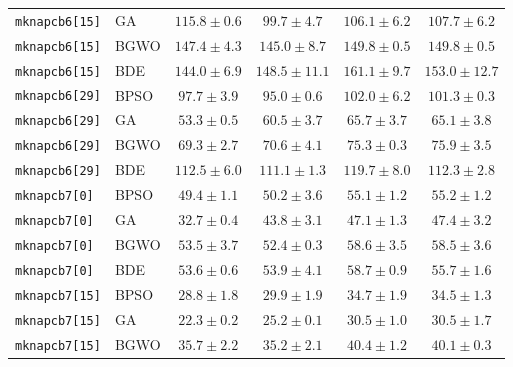 \documentclass[journal,article,submit,moreauthors]{Definitions/mdpi}
\begin{document}
\begin{longtable}{llcccc}
    \texttt{mknapcb6[15]} & GA    &          $115.8 \pm 0.6$ &  $\mathbf{99.7 \pm 4.7}$ &          $106.1 \pm 6.2$ &          $107.7 \pm 6.2$ \\
    \texttt{mknapcb6[15]} & BGWO  &          $147.4 \pm 4.3$ & $\mathbf{145.0 \pm 8.7}$ &          $149.8 \pm 0.5$ &          $149.8 \pm 0.5$ \\
    \texttt{mknapcb6[15]} & BDE   & $\mathbf{144.0 \pm 6.9}$ &         $148.5 \pm 11.1$ &          $161.1 \pm 9.7$ &         $153.0 \pm 12.7$ \\
    \midrule
    \texttt{mknapcb6[29]} & BPSO  &           $97.7 \pm 3.9$ &  $\mathbf{95.0 \pm 0.6}$ &          $102.0 \pm 6.2$ &          $101.3 \pm 0.3$ \\
    \texttt{mknapcb6[29]} & GA    &  $\mathbf{53.3 \pm 0.5}$ &           $60.5 \pm 3.7$ &           $65.7 \pm 3.7$ &           $65.1 \pm 3.8$ \\
    \texttt{mknapcb6[29]} & BGWO  &  $\mathbf{69.3 \pm 2.7}$ &           $70.6 \pm 4.1$ &           $75.3 \pm 0.3$ &           $75.9 \pm 3.5$ \\
    \texttt{mknapcb6[29]} & BDE   &          $112.5 \pm 6.0$ & $\mathbf{111.1 \pm 1.3}$ &          $119.7 \pm 8.0$ &          $112.3 \pm 2.8$ \\
    \midrule
    \texttt{mknapcb7[0]} & BPSO  &  $\mathbf{49.4 \pm 1.1}$ &           $50.2 \pm 3.6$ &           $55.1 \pm 1.2$ &           $55.2 \pm 1.2$ \\
    \texttt{mknapcb7[0]} & GA    &  $\mathbf{32.7 \pm 0.4}$ &           $43.8 \pm 3.1$ &           $47.1 \pm 1.3$ &           $47.4 \pm 3.2$ \\
    \texttt{mknapcb7[0]} & BGWO  &           $53.5 \pm 3.7$ &  $\mathbf{52.4 \pm 0.3}$ &           $58.6 \pm 3.5$ &           $58.5 \pm 3.6$ \\
    \texttt{mknapcb7[0]} & BDE   &  $\mathbf{53.6 \pm 0.6}$ &           $53.9 \pm 4.1$ &           $58.7 \pm 0.9$ &           $55.7 \pm 1.6$ \\
    \midrule
    \texttt{mknapcb7[15]} & BPSO  &  $\mathbf{28.8 \pm 1.8}$ &           $29.9 \pm 1.9$ &           $34.7 \pm 1.9$ &           $34.5 \pm 1.3$ \\
    \texttt{mknapcb7[15]} & GA    &  $\mathbf{22.3 \pm 0.2}$ &           $25.2 \pm 0.1$ &           $30.5 \pm 1.0$ &           $30.5 \pm 1.7$ \\
    \texttt{mknapcb7[15]} & BGWO  &           $35.7 \pm 2.2$ &  $\mathbf{35.2 \pm 2.1}$ &           $40.4 \pm 1.2$ &           $40.1 \pm 0.3$ \\

\end{longtable}
\end{document}

